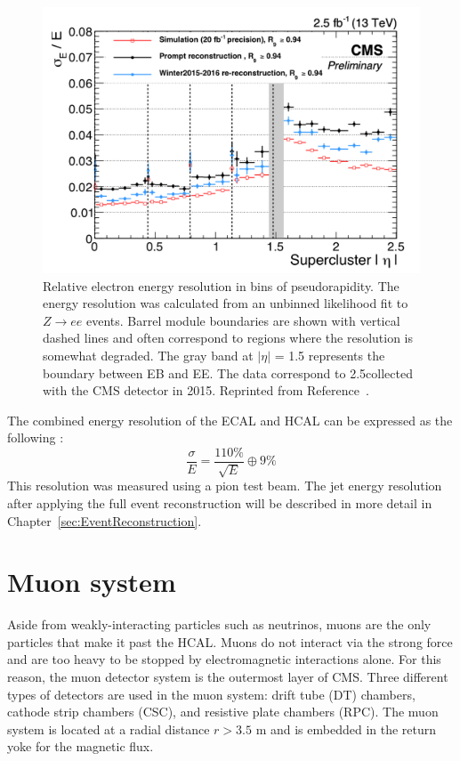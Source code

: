 \begin{figure}[h!]
	\centering
	\includegraphics[width=\linewidth]{Figures/Detector/EcalEnergyResolution.png}
       \caption[Relative electron energy resolution in bins of pseudorapidity.]
       {Relative electron energy resolution in bins of pseudorapidity. 
       The energy resolution was calculated from an unbinned likelihood fit to $Z\rightarrow ee$ events.
        Barrel module boundaries are shown with vertical dashed lines and often correspond to regions where the resolution is somewhat degraded. The gray band at $|\eta|$ = 1.5 represents the boundary between EB and EE.
        The data correspond to 2.5\fbinv collected with the CMS detector in 2015.
        Reprinted from Reference~\cite{ECALDPGtwiki2}.}
         \label{fig:ecal_resolution}
\end{figure}

The combined energy resolution of the ECAL and HCAL can be expressed as the following \cite{ParticleFlow}:
\begin{equation}
\frac{\sigma}{E} = \frac{110\%}{\sqrt{E}} \oplus 9\% 
\end{equation}
This resolution was measured using a pion test beam. The jet energy resolution after applying the full event reconstruction will be described in more detail in Chapter~\ref{sec:EventReconstruction}.



\section{Muon system}
\label{sec:Muon}
Aside from weakly-interacting particles such as neutrinos, muons are the only particles that make it past the HCAL. Muons do not interact via the strong force and are too heavy to be stopped by electromagnetic interactions alone. For this reason, the muon detector system is the outermost layer of CMS. Three different types of detectors are used in the muon system: drift tube (DT) chambers, cathode strip chambers (CSC), and resistive plate chambers (RPC). The muon system is located at a radial distance $r > 3.5$ m and is embedded in the return yoke for the magnetic flux.

